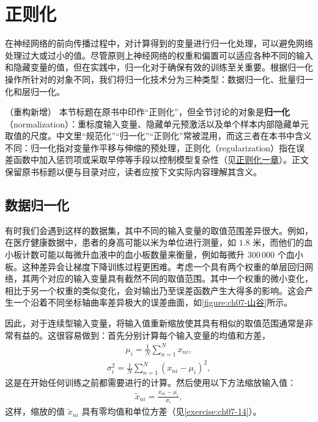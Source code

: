 \documentclass[../../main.tex]{subfiles}
\begin{document}
\section{正则化}\label{section:ch07-正则化}

在神经网络的前向传播过程中，对计算得到的变量进行归一化处理，可以避免网络处理过大或过小的值。尽管原则上神经网络的权重和偏置可以适应各种不同的输入和隐藏变量的值，但在实践中，归一化对于确保有效的训练至关重要。根据归一化操作所针对的对象不同，我们将归一化技术分为三种类型：数据归一化、批量归一化和层归一化。

\begin{remark}（重构新增）
本节标题在原书中印作“正则化”，但全节讨论的对象是\textbf{归一化}（normalization）：重标度输入变量、隐藏单元预激活以及单个样本内部隐藏单元取值的尺度。中文里“规范化”“归一化”“正则化”常被混用，而这三者在本书中含义不同：归一化指对变量作平移与伸缩的预处理，正则化（regularization）指在误差函数中加入惩罚项或采取早停等手段以控制模型复杂性（见\hyperref[chapter:ch09-正则化]{正则化一章}）。正文保留原书标题以便与目录对应，读者应按下文实际内容理解其含义。
\end{remark}

\subsection{数据归一化}\label{subsection:ch07-数据归一化}

有时我们会遇到这样的数据集，其中不同的输入变量的取值范围差异很大。例如，在医疗健康数据中，患者的身高可能以米为单位进行测量，如 $1.8$ 米，而他们的血小板计数可能以每微升血液中的血小板数量来衡量，例如每微升 $300\,000$ 个血小板。这种差异会让梯度下降训练过程更困难。考虑一个具有两个权重的单层回归网络，其两个对应的输入变量具有截然不同的取值范围。其中一个权重的微小变化，相比于另一个权重的类似变化，会对输出乃至误差函数产生大得多的影响。这会产生一个沿着不同坐标轴曲率差异极大的误差曲面，如\cref{figure:ch07-山谷}所示。

因此，对于连续型输入变量，将输入值重新缩放使其具有相似的取值范围通常是非常有益的。这很容易做到：首先分别计算每个输入变量的均值和方差，
\begin{align}
\mu_i = \frac{1}{N}\sum_{n=1}^{N}x_{ni},
\label{align:ch07-输入均值}
\end{align}
\begin{align}
\sigma_i^{2} = \frac{1}{N}\sum_{n=1}^{N}(x_{ni}-\mu_i)^{2},
\label{align:ch07-输入方差}
\end{align}
这是在开始任何训练之前都需要进行的计算。然后使用以下方法缩放输入值：
\begin{align}
\tilde{x}_{ni} = \frac{x_{ni}-\mu_i}{\sigma_i},
\label{align:ch07-输入标准化}
\end{align}
这样，缩放的值 $\tilde{x}_{ni}$ 具有零均值和单位方差（见\cref{exercise:ch07-14}）。
\end{document}
